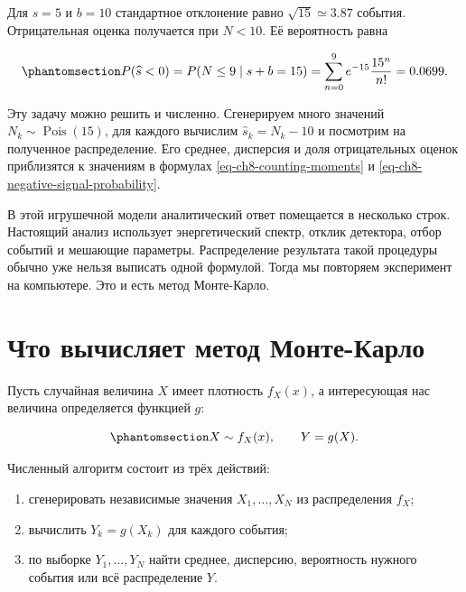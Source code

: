 \documentclass[
  russian,
  11pt,
  a4paper,
  open=any]{scrbook}
\providecommand{\tightlist}{%
  \setlength{\itemsep}{0pt}\setlength{\parskip}{0pt}}
\begin{document}
Для \(s=5\) и \(b=10\) стандартное отклонение равно
\(\sqrt{15}\simeq3.87\) события. Отрицательная оценка получается при
\(N<10\). Её вероятность равна

\begin{equation}\protect\phantomsection\label{eq-ch8-negative-signal-probability}{
P(\widehat s<0)
=P(N\leq9\mid s+b=15)
=\sum_{n=0}^{9}e^{-15}\frac{15^n}{n!}
=0.0699.
}\end{equation}

Эту задачу можно решить и численно. Сгенерируем много значений
\(N_k\sim\operatorname{Pois}(15)\), для каждого вычислим
\(\widehat s_k=N_k-10\) и посмотрим на полученное распределение. Его
среднее, дисперсия и доля отрицательных оценок приблизятся к значениям в
формулах \ref{eq-ch8-counting-moments} и
\ref{eq-ch8-negative-signal-probability}.

В этой игрушечной модели аналитический ответ помещается в несколько
строк. Настоящий анализ использует энергетический спектр, отклик
детектора, отбор событий и мешающие параметры. Распределение результата
такой процедуры обычно уже нельзя выписать одной формулой. Тогда мы
повторяем эксперимент на компьютере. Это и есть метод Монте-Карло.

\section{Что вычисляет метод
Монте-Карло}\label{ux447ux442ux43e-ux432ux44bux447ux438ux441ux43bux44fux435ux442-ux43cux435ux442ux43eux434-ux43cux43eux43dux442ux435-ux43aux430ux440ux43bux43e}

Пусть случайная величина \(X\) имеет плотность \(f_X(x)\), а
интересующая нас величина определяется функцией \(g\):

\begin{equation}\protect\phantomsection\label{eq-ch8-general-transformation}{
X\sim f_X(x),
\qquad
Y=g(X).
}\end{equation}

Численный алгоритм состоит из трёх действий:

\begin{enumerate}
\def\labelenumi{\arabic{enumi}.}
\tightlist
\item
  сгенерировать независимые значения \(X_1,\ldots,X_N\) из распределения
  \(f_X\);
\item
  вычислить \(Y_k=g(X_k)\) для каждого события;
\item
  по выборке \(Y_1,\ldots,Y_N\) найти среднее, дисперсию, вероятность
  нужного события или всё распределение \(Y\).
\end{enumerate}
\end{document}
